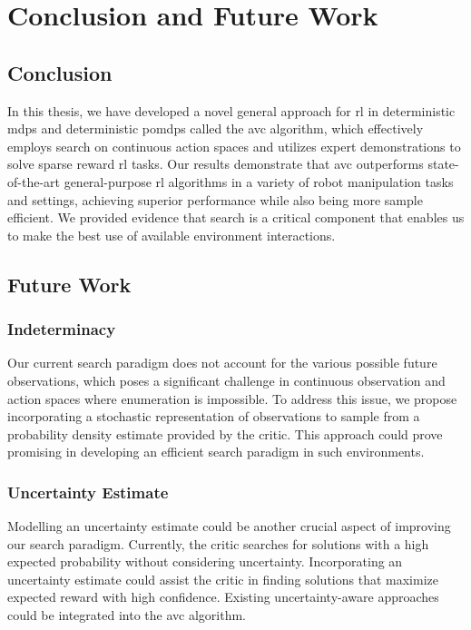 
\chapter{Conclusion and Future Work}
\label{chapter:Conc_Fut}
\section{Conclusion}
In this thesis, we have developed a novel general approach for \ac{rl} in deterministic \ac{mdp}s and deterministic \ac{pomdp}s called the \ac{avc} algorithm, 
which effectively employs search on continuous action spaces and utilizes 
expert demonstrations to solve sparse reward \ac{rl} tasks. Our results demonstrate that \ac{avc} 
outperforms state-of-the-art general-purpose \ac{rl} algorithms in a variety of robot manipulation tasks and settings, achieving superior performance 
while also being more sample efficient. We provided evidence that search is a critical component that enables us to make the best use of available 
environment interactions.

\section{Future Work}
\subsection{Indeterminacy}
Our current search paradigm does not account for the various possible future observations, which poses a significant challenge in 
continuous observation and action spaces where enumeration is impossible. To address this issue, we propose incorporating a stochastic 
representation of observations to sample from a probability density estimate provided by the critic. 
This approach could prove promising in developing an efficient search paradigm in such environments.

\subsection{Uncertainty Estimate}
Modelling an uncertainty estimate could be another crucial aspect of improving our search paradigm. 
Currently, the critic searches for solutions with a high expected probability without considering uncertainty. 
Incorporating an uncertainty estimate could assist the critic in finding solutions that maximize expected reward with high confidence. 
Existing uncertainty-aware approaches \cite{gawlikowski2022survey,liu2022simple} 
could be integrated into the \ac{avc} algorithm.

